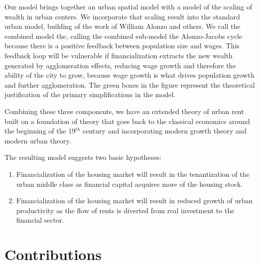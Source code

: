 Our model brings together an urban spatial model with a model of the scaling of wealth in urban centers. %
We incorporate that scaling result into the standard urban model, building of the work of William Alonzo and others. %
We call the combined model the\cite{alonzoTheoryUrbanLand1960}, calling the combined sub-model the 
\gls{Alonzo-Jacobs cycle} because there is a positive feedback between population size and wages. This feedback loop will be vulnerable if financialization extracts the new wealth generated by agglomeration effects, reducing wage growth and therefore the ability of the city to grow, because wage growth is what drives population growth and further agglomeration.
The green boxes in the figure represent the theoretical justification of the primary simplifications in the model. 

Combining these three components, we have an extended theory of urban rent built on a foundation of theory that goes back to the \gls{classical economics} around the beginning of the 19$^{th}$ century and incorporating modern growth theory and modern urban theory. 

The resulting model suggests two basic hypotheses:
\begin{enumerate}
    \item Financialization of the housing market will result in the tenantization of the urban middle class as financial capital acquires more of the housing stock. %
    \item Financialization of the housing market will result in reduced growth of urban productivity as the flow of rents is diverted from real investment to the financial sector.
\end{enumerate} 

\section{Contributions}

